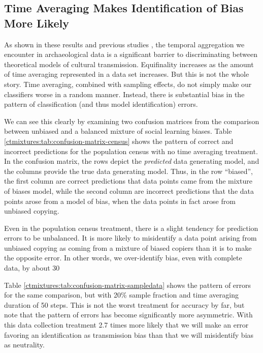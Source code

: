 \subsection{Time Averaging Makes Identification of Bias More Likely}

As shown in these results and previous studies \citep{Madsen2012,Porvcic2014,Premo2014}, the temporal aggregation we encounter in archaeological data is a significant barrier to discriminating between theoretical models of cultural transmission.  Equifinality increases as the amount of time averaging represented in a data set increases.  But this is not the whole story.  Time averaging, combined with sampling effects, do not simply make our classifiers worse in a random manner.  Instead, there is substantial bias in the pattern of classification (and thus model identification) errors.  

We can see this clearly by examining two confusion matrices from the comparison between unbiased and a balanced mixture of social learning biases.  Table \ref{ctmixtures:tab:confusion-matrix-census} shows the pattern of correct and incorrect predictions for the population census with no time averaging treatment.  In the confusion matrix, the rows depict the \emph{predicted} data generating model, and the columns provide the true data generating model.  Thus, in the row ``biased'', the first column are correct predictions that data points came from the mixture of biases model, while the second column are incorrect predictions that the data points arose from a model of bias, when the data points in fact arose from unbiased copying.

Even in the population census treatment, there is a slight tendency for prediction errors to be unbalanced.  It is more likely to misidentify a data point arising from unbiased copying as coming from a mixture of biased copiers than it is to make the opposite error.  In other words, we over-identify bias, even with complete data, by about 30%

Table \ref{ctmixtures:tab:confusion-matrix-sampledata} shows the pattern of errors for the same comparison, but with 20\% sample fraction and time averaging duration of 50 steps.  This is not the worst treatment for accuracy by far, but note that the pattern of errors has become significantly more asymmetric.  With this data collection treatment 2.7 times more likely that we will make an error favoring an identification as transmission bias than that we will misidentify bias as neutrality.  

